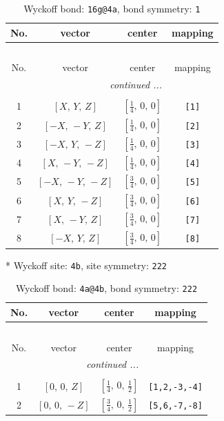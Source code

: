 \documentclass[fleqn,8pt]{jsarticle}
\begin{document}
\renewcommand{\arraystretch}{1.2}
\begin{longtable}{cccc}
\caption{Wyckoff bond: {\tt 16g@4a}, bond symmetry: {\tt 1}}
 \\
 \hline \hline
No. & vector & center & mapping \\ \hline \endfirsthead

\multicolumn{3}{l}{\tablename\ \thetable{}} \\
 \hline \hline
No. & vector & center & mapping \\ \hline \endhead

 \hline \hline
\multicolumn{3}{r}{\footnotesize\it continued ...} \\ \endfoot

 \hline \hline
\multicolumn{3}{r}{} \\ \endlastfoot

1 & $\left[ X,\, Y,\, Z \right]$ & $\left[ \frac{1}{4},\, 0,\, 0 \right]$ & {\tt [1]} \\ \hline
2 & $\left[ - X,\, - Y,\, Z \right]$ & $\left[ \frac{1}{4},\, 0,\, 0 \right]$ & {\tt [2]} \\ \hline
3 & $\left[ - X,\, Y,\, - Z \right]$ & $\left[ \frac{1}{4},\, 0,\, 0 \right]$ & {\tt [3]} \\ \hline
4 & $\left[ X,\, - Y,\, - Z \right]$ & $\left[ \frac{1}{4},\, 0,\, 0 \right]$ & {\tt [4]} \\ \hline
5 & $\left[ - X,\, - Y,\, - Z \right]$ & $\left[ \frac{3}{4},\, 0,\, 0 \right]$ & {\tt [5]} \\ \hline
6 & $\left[ X,\, Y,\, - Z \right]$ & $\left[ \frac{3}{4},\, 0,\, 0 \right]$ & {\tt [6]} \\ \hline
7 & $\left[ X,\, - Y,\, Z \right]$ & $\left[ \frac{3}{4},\, 0,\, 0 \right]$ & {\tt [7]} \\ \hline
8 & $\left[ - X,\, Y,\, Z \right]$ & $\left[ \frac{3}{4},\, 0,\, 0 \right]$ & {\tt [8]} \\
\end{longtable}
* Wyckoff site: {\tt 4b}, site symmetry: {\tt 222}
\renewcommand{\arraystretch}{1.2}
\begin{longtable}{cccc}
\caption{Wyckoff bond: {\tt 4a@4b}, bond symmetry: {\tt 222}}
 \\
 \hline \hline
No. & vector & center & mapping \\ \hline \endfirsthead

\multicolumn{3}{l}{\tablename\ \thetable{}} \\
 \hline \hline
No. & vector & center & mapping \\ \hline \endhead

 \hline \hline
\multicolumn{3}{r}{\footnotesize\it continued ...} \\ \endfoot

 \hline \hline
\multicolumn{3}{r}{} \\ \endlastfoot

1 & $\left[ 0,\, 0,\, Z \right]$ & $\left[ \frac{1}{4},\, 0,\, \frac{1}{2} \right]$ & {\tt [1,2,-3,-4]} \\ \hline
2 & $\left[ 0,\, 0,\, - Z \right]$ & $\left[ \frac{3}{4},\, 0,\, \frac{1}{2} \right]$ & {\tt [5,6,-7,-8]} \\
\end{longtable}
\end{document}
